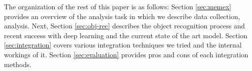 



The organization of the rest of this paper is as follows: Section \ref{sec:memex} provides an overview of the analysis task in which we describe data collection, analysis. Next, Section \ref{sec:obj-rec} describes the object recognition process and recent success with deep learning and the current state of the art model. Section \ref{sec:integration} covers various integration techniques we tried and the internal workings of it. Section \ref{sec:evaluation} provides pros and cons of each integration methods.
